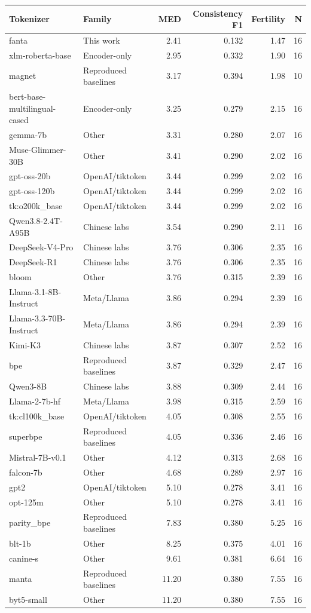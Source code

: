 \documentclass{standalone}
\begin{document}
\begin{tabular}{llrrrr}
\toprule
Tokenizer & Family & MED & Consistency F1 & Fertility & N \\
\midrule
fanta & This work & 2.41 & 0.132 & 1.47 & 16 \\
xlm-roberta-base & Encoder-only & 2.95 & 0.332 & 1.90 & 16 \\
magnet & Reproduced baselines & 3.17 & 0.394 & 1.98 & 10 \\
bert-base-multilingual-cased & Encoder-only & 3.25 & 0.279 & 2.15 & 16 \\
gemma-7b & Other & 3.31 & 0.280 & 2.07 & 16 \\
Muse-Glimmer-30B & Other & 3.41 & 0.290 & 2.02 & 16 \\
gpt-oss-20b & OpenAI/tiktoken & 3.44 & 0.299 & 2.02 & 16 \\
gpt-oss-120b & OpenAI/tiktoken & 3.44 & 0.299 & 2.02 & 16 \\
tk:o200k\_base & OpenAI/tiktoken & 3.44 & 0.299 & 2.02 & 16 \\
Qwen3.8-2.4T-A95B & Chinese labs & 3.54 & 0.290 & 2.11 & 16 \\
DeepSeek-V4-Pro & Chinese labs & 3.76 & 0.306 & 2.35 & 16 \\
DeepSeek-R1 & Chinese labs & 3.76 & 0.306 & 2.35 & 16 \\
bloom & Other & 3.76 & 0.315 & 2.39 & 16 \\
Llama-3.1-8B-Instruct & Meta/Llama & 3.86 & 0.294 & 2.39 & 16 \\
Llama-3.3-70B-Instruct & Meta/Llama & 3.86 & 0.294 & 2.39 & 16 \\
Kimi-K3 & Chinese labs & 3.87 & 0.307 & 2.52 & 16 \\
bpe & Reproduced baselines & 3.87 & 0.329 & 2.47 & 16 \\
Qwen3-8B & Chinese labs & 3.88 & 0.309 & 2.44 & 16 \\
Llama-2-7b-hf & Meta/Llama & 3.98 & 0.315 & 2.59 & 16 \\
tk:cl100k\_base & OpenAI/tiktoken & 4.05 & 0.308 & 2.55 & 16 \\
superbpe & Reproduced baselines & 4.05 & 0.336 & 2.46 & 16 \\
Mistral-7B-v0.1 & Other & 4.12 & 0.313 & 2.68 & 16 \\
falcon-7b & Other & 4.68 & 0.289 & 2.97 & 16 \\
gpt2 & OpenAI/tiktoken & 5.10 & 0.278 & 3.41 & 16 \\
opt-125m & Other & 5.10 & 0.278 & 3.41 & 16 \\
parity\_bpe & Reproduced baselines & 7.83 & 0.380 & 5.25 & 16 \\
blt-1b & Other & 8.25 & 0.375 & 4.01 & 16 \\
canine-s & Other & 9.61 & 0.381 & 6.64 & 16 \\
manta & Reproduced baselines & 11.20 & 0.380 & 7.55 & 16 \\
byt5-small & Other & 11.20 & 0.380 & 7.55 & 16 \\
\bottomrule
\end{tabular}
\end{document}
